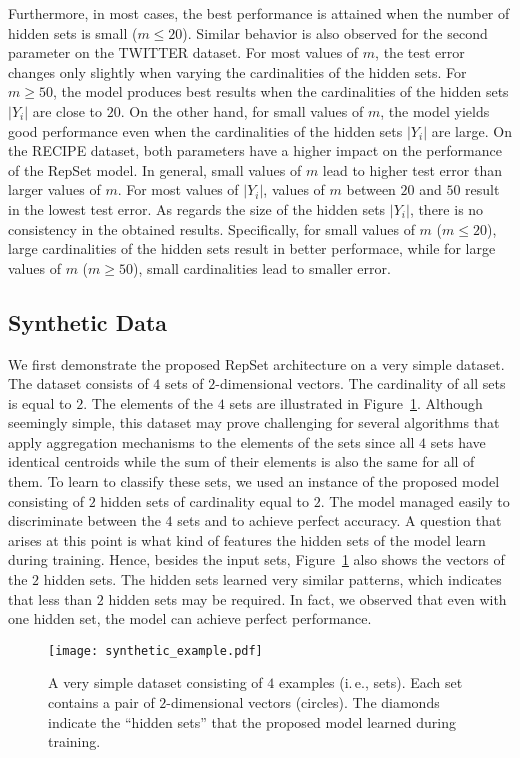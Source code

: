 \documentclass[twoside]{article}
\newcommand{\ie}{i.\,e., }
\begin{document}
Furthermore, in most cases, the best performance is attained when the number of hidden sets is small ($m \leq 20$).
Similar behavior is also observed for the second parameter on the TWITTER dataset.
For most values of $m$, the test error changes only slightly when varying the cardinalities of the hidden sets.
For $m \geq 50$, the model produces best results when the cardinalities of the hidden sets $|Y_i|$ are close to $20$.
On the other hand, for small values of $m$, the model yields good performance even when the cardinalities of the hidden sets $|Y_i|$ are large.
On the RECIPE dataset, both parameters have a higher impact on the performance of the RepSet model.
In general, small values of $m$ lead to higher test error than larger values of $m$.
For most values of $|Y_i|$, values of $m$ between $20$ and $50$ result in the lowest test error.
As regards the size of the hidden sets $|Y_i|$, there is no consistency in the obtained results.
Specifically, for small values of $m$ ($m \leq 20$), large cardinalities of the hidden sets result in better performace, while for large values of $m$ ($m \geq 50$), small cardinalities lead to smaller error. 



\subsection{Synthetic Data}
We first demonstrate the proposed RepSet architecture on a very simple dataset.
The dataset consists of $4$ sets of $2$-dimensional vectors.
The cardinality of all sets is equal to $2$.
The elements of the $4$ sets are illustrated in Figure~\ref{fig:toy_example}. 
Although seemingly simple, this dataset may prove challenging for several algorithms that apply aggregation mechanisms to the elements of the sets since all $4$ sets have identical centroids while the sum of their elements is also the same for all of them.
To learn to classify these sets, we used an instance of the proposed model consisting of $2$ hidden sets of cardinality equal to $2$.
The model managed easily to discriminate between the $4$ sets and to achieve perfect accuracy.
A question that arises at this point is what kind of features the hidden sets of the model learn during training.
Hence, besides the input sets, Figure~\ref{fig:toy_example} also shows the vectors of the $2$ hidden sets.
The hidden sets learned very similar patterns, which indicates that less than $2$ hidden sets may be required.
In fact, we observed that even with one hidden set, the model can achieve perfect performance.

\begin{figure}[H]
    \centering
    \texttt{[image: synthetic\_example.pdf]}
    \caption{A very simple dataset consisting of $4$ examples (\ie sets). Each set contains a pair of $2$-dimensional vectors (circles). The diamonds indicate the ``hidden sets'' that the proposed model learned during training.}
    \label{fig:toy_example}
\end{figure}
\end{document}

